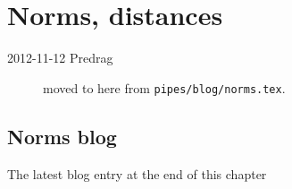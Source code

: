 
\chapter{Norms, distances}
\label{c-norms}

\begin{description}

\item[2012-11-12 Predrag]
moved to here from \texttt{pipes/blog/norms.tex}.

\end{description}

\section{Norms blog}

\bigskip\bigskip
\noindent
{\color{red} The latest blog entry at the end of this chapter}
\bigskip\bigskip

